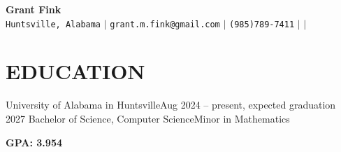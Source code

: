 \documentclass[letterpaper,11pt]{article}
\begin{document}
\begin{center}
    \textbf{\Huge Grant Fink} \\ \vspace{10pt} \small
    \faMapMarker* \hspace{2pt}\texttt{Huntsville, Alabama} \hspace{1pt} $|$ \hspace{1pt}
    \faEnvelope \hspace{2pt} \texttt{grant.m.fink\hspace{0.3em}@\hspace{0.3em}gmail.com} \hspace{1pt} $|$ \hspace{1pt}
    \faPhone* \hspace{1pt} \texttt{(985)\hspace{0.3em}789\hspace{0.1em}-\hspace{0.1em}7411} \hspace{1pt} $|$ \hspace{1pt}
    \faLinkedin \hspace{2pt} {\href{https://www.linkedin.com/in/grant-m-fink/}{}} \hspace{1pt} $|$ \hspace{1pt}
    \faGithub \hspace{2pt} {\href{https://github.com/gmf-uah}{}}
    \\ \vspace{-3pt}
\end{center}

\section{EDUCATION}
	\resumeSubHeadingListStart
	\resumeSubheadingWithMinor
      {University of Alabama in Huntsville}{Aug 2024 -- present, expected graduation 2027}
      {Bachelor of Science, Computer Science}{}{Minor in Mathematics}%
		\vspace{-4pt}
        \begin{gpabox}
        \textbf{GPA: 3.954}
        \end{gpabox}
		\vspace{2pt}
\end{document}
